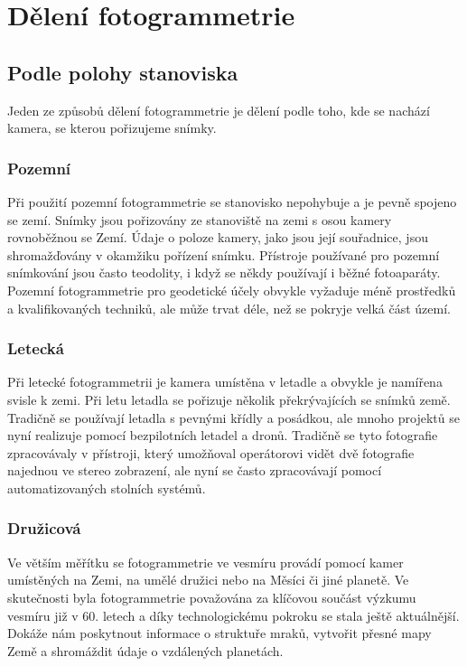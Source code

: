 \documentclass[12pt]{report}			%
\begin{document}
            
        \chapter{Dělení fotogrammetrie}
            \section{Podle polohy stanoviska}
                Jeden ze způsobů dělení fotogrammetrie je dělení podle toho, kde se nachází kamera, se kterou pořizujeme snímky.
                \subsection{Pozemní}
                    Při použití pozemní fotogrammetrie se stanovisko nepohybuje a je pevně spojeno se zemí. Snímky jsou pořizovány ze stanoviště na zemi s osou kamery rovnoběžnou se Zemí. Údaje o poloze kamery, jako jsou její souřadnice, jsou shromažďovány v okamžiku pořízení snímku. Přístroje používané pro pozemní snímkování jsou často teodolity, i když se někdy používají i běžné fotoaparáty. Pozemní fotogrammetrie pro geodetické účely obvykle vyžaduje méně prostředků a kvalifikovaných techniků, ale může trvat déle, než se pokryje velká část území.
                \subsection{Letecká}
                    Při letecké fotogrammetrii je kamera umístěna v letadle a obvykle je namířena svisle k zemi. Při letu letadla se pořizuje několik překrývajících se snímků země. Tradičně se používají letadla s pevnými křídly a posádkou, ale mnoho projektů se nyní realizuje pomocí bezpilotních letadel a dronů. Tradičně se tyto fotografie zpracovávaly v přístroji, který umožňoval operátorovi vidět dvě fotografie najednou ve stereo zobrazení, ale nyní se často zpracovávají pomocí automatizovaných stolních systémů.

                \subsection{Družicová}
                Ve větším měřítku se fotogrammetrie ve vesmíru provádí pomocí kamer umístěných na Zemi, na umělé družici nebo na Měsíci či jiné planetě. Ve skutečnosti byla fotogrammetrie považována za klíčovou součást výzkumu vesmíru již v 60. letech a díky technologickému pokroku se stala ještě aktuálnější. Dokáže nám poskytnout informace o struktuře mraků, vytvořit přesné mapy Země a shromáždit údaje o vzdálených planetách.
\end{document}
